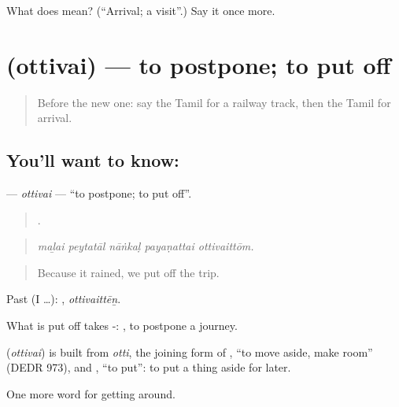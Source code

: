 \begin{tcolorbox}[breakable,colback=teal!4,colframe=teal!35!black,title={Before you move on}]
What does  mean? (\textquotedblleft{}Arrival; a visit\textquotedblright{}.) Say it once more.
\end{tcolorbox}
\section[\texorpdfstring{\ta{ஒத்திவை} (ottivai)}{ஒத்திவை (ottivai)}]{ (ottivai) — to postpone; to put off}

\label{lesson:TA-C400-ottivai}



\begin{quote}
Before the new one: say the Tamil for a railway track, then the Tamil for arrival.
\end{quote}

\subsection*{You'll want to know: }
\textbf{} — \emph{ottivai} — \textquotedblleft{}to postpone; to put off\textquotedblright{}.

\begin{quote}
    .
\end{quote}

\begin{quote}
\emph{maḻai peytatāl nāṅkaḷ payaṇattai ottivaittōm.}
\end{quote}

\begin{quote}
Because it rained, we put off the trip.
\end{quote}

Past (I …): , \emph{ottivaittēṉ}.

What is put off takes -:  , to postpone a journey.

\begin{cousinweb}
\textbf{} (\emph{ottivai}) is built from \emph{otti}, the joining form of , \textquotedblleft{}to move aside, make room\textquotedblright{} (DEDR 973), and , \textquotedblleft{}to put\textquotedblright{}: to put a thing aside for later.
\end{cousinweb}

\begin{grammarlens}[title={What you've built}]
One more word for getting around.
\end{grammarlens}

